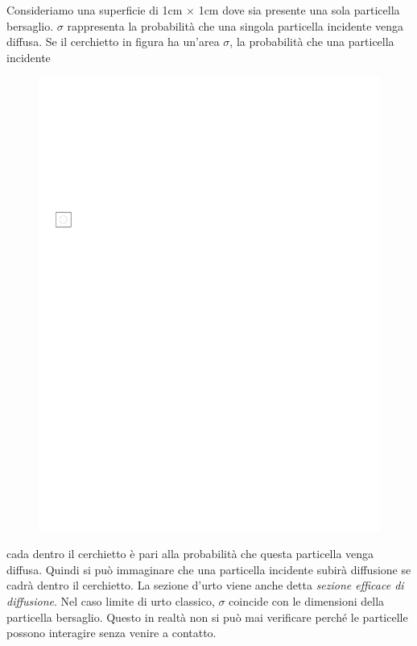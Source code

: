 Consideriamo una superficie di 1cm $\times$ 1cm dove sia presente una sola 
particella bersaglio. $\sigma$ rappresenta la probabilità che una singola 
particella incidente venga diffusa. Se il cerchietto in figura ha un'area 
$\sigma$, la probabilità che una particella incidente
\begin{figure}
\includegraphics[scale=2]{img/sez_urto_p10}
\end{figure}
cada dentro il cerchietto è pari alla probabilità che questa particella venga 
diffusa. Quindi si può immaginare che una particella incidente subirà 
diffusione se cadrà dentro il cerchietto. La sezione d'urto viene anche detta 
\textit{sezione efficace di diffusione}. Nel caso limite di urto classico, 
$\sigma$ coincide con le dimensioni della particella bersaglio. Questo in 
realtà non si può mai verificare perché le particelle possono interagire 
senza venire a contatto.

